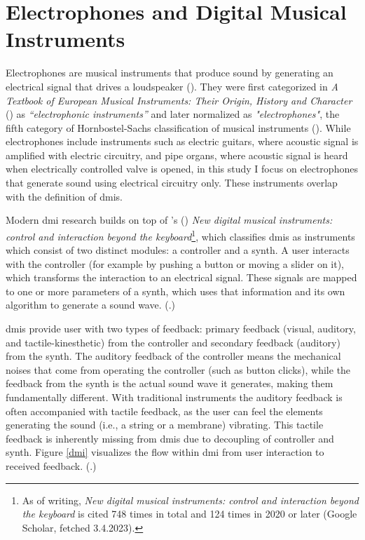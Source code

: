 \section{Electrophones and Digital Musical Instruments}

Electrophones are musical instruments that produce sound by generating an electrical signal that drives a loudspeaker (\cite{mimo2011}). They were first categorized in \textit{A Textbook of European Musical Instruments: Their Origin, History and Character} (\cite{galpin1937}) as \textit{“electrophonic instruments”} and later normalized as \textit{"electrophones"}, the fifth category of Hornbostel-Sachs classification of musical instruments (\cite{lee2019}). While electrophones include instruments such as electric guitars, where acoustic signal is amplified with electric circuitry, and pipe organs, where acoustic signal is heard when electrically controlled valve is opened, in this study I focus on electrophones that generate sound using electrical circuitry only. These instruments overlap with the definition of \glspl{dmi}.

Modern \gls{dmi} research builds on top of \citeauthor{miranda-wanderley2006}'s (\citeyear{miranda-wanderley2006}) \textit{New digital musical instruments: control and interaction beyond the keyboard}\footnote{As of writing, \textit{New digital musical instruments: control and interaction beyond the keyboard} is cited 748 times in total and 124 times in 2020 or later (Google Scholar, fetched 3.4.2023).}, which classifies \glspl{dmi} as instruments which consist of two distinct modules: a \gls{controller} and a \gls{synth}. A user interacts with the \gls{controller} (for example by pushing a button or moving a slider on it), which transforms the interaction to an electrical signal. These signals are mapped to one or more parameters of a \gls{synth}, which uses that information and its own algorithm to generate a sound wave. (\cite{miranda-wanderley2006}.)

\glspl{dmi} provide user with two types of feedback: primary feedback (visual, auditory, and tactile-kinesthetic) from the \gls{controller} and secondary feedback (auditory) from the \gls{synth}. The auditory feedback of the \gls{controller} means the mechanical noises that come from operating the \gls{controller} (such as button clicks), while the feedback from the \gls{synth} is the actual sound wave it generates, making them fundamentally different. With traditional instruments the auditory feedback is often accompanied with tactile feedback, as the user can feel the elements generating the sound (i.e., a string or a membrane) vibrating. This tactile feedback is inherently missing from \glspl{dmi} due to decoupling of \gls{controller} and \gls{synth}. Figure \ref{dmi} visualizes the flow within \gls{dmi} from user interaction to received feedback. (\cite{miranda-wanderley2006}.)

